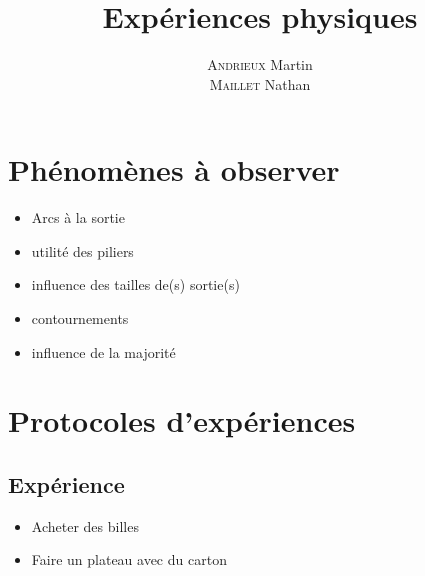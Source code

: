 \documentclass[12pt, a4paper, french]{article}
\title{Expériences physiques}
\author{\textsc{Andrieux} Martin\\
		\textsc{Maillet} Nathan}
\begin{document}
	\maketitle
	\section{Phénomènes à observer}
		\begin{itemize}
			\item Arcs à la sortie
			\item utilité des piliers
			\item influence des tailles de(s) sortie(s)
			\item contournements
			\item influence de la majorité
		\end{itemize}
	\section{Protocoles d'expériences}
		\subsection{Expérience}
			\begin{itemize}
				\item Acheter des billes
				\item Faire un plateau avec du carton
			\end{itemize}
\end{document}
